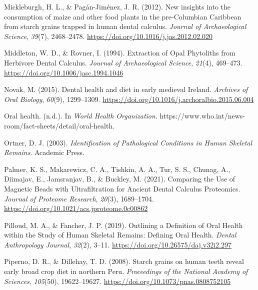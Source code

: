 \documentclass[
  b5paper,
]{book}
\newlength{\cslhangindent}
\newlength{\cslentryspacingunit} %
\newenvironment{CSLReferences}[2] %
 {%
  \setlength{\parindent}{0pt}
  \ifodd #1
  \let\oldpar\par
  \def\par{\hangindent=\cslhangindent\oldpar}
  \fi
  \setlength{\parskip}{#2\cslentryspacingunit}
 }%
 {}
\begin{document}
\begin{CSLReferences}{1}{0}
\leavevmode{}%
Mickleburgh, H. L., \& Pagán-Jiménez, J. R. (2012). New insights into
the consumption of maize and other food plants in the pre-{Columbian
Caribbean} from starch grains trapped in human dental calculus.
\emph{Journal of Archaeological Science}, \emph{39}(7), 2468--2478.
\url{https://doi.org/10.1016/j.jas.2012.02.020}

\leavevmode{}%
Middleton, W. D., \& Rovner, I. (1994). Extraction of {Opal Phytoliths}
from {Herbivore Dental Calculus}. \emph{Journal of Archaeological
Science}, \emph{21}(4), 469--473.
\url{https://doi.org/10.1006/jasc.1994.1046}

\leavevmode{}%
Novak, M. (2015). Dental health and diet in early medieval {Ireland}.
\emph{Archives of Oral Biology}, \emph{60}(9), 1299--1309.
\url{https://doi.org/10.1016/j.archoralbio.2015.06.004}

\leavevmode{}%
Oral health. (n.d.). In \emph{World Health Organization}.
https://www.who.int/news-room/fact-sheets/detail/oral-health.

\leavevmode{}%
Ortner, D. J. (2003). \emph{Identification of {Pathological Conditions}
in {Human Skeletal Remains}}. {Academic Press}.

\leavevmode{}%
Palmer, K. S., Makarewicz, C. A., Tishkin, A. A., Tur, S. S., Chunag,
A., Diimajav, E., Jamsranjav, B., \& Buckley, M. (2021). Comparing the
{Use} of {Magnetic Beads} with {Ultrafiltration} for {Ancient Dental
Calculus Proteomics}. \emph{Journal of Proteome Research}, \emph{20}(3),
1689--1704. \url{https://doi.org/10.1021/acs.jproteome.0c00862}

\leavevmode{}%
Pilloud, M. A., \& Fancher, J. P. (2019). Outlining a {Definition} of
{Oral Health} within the {Study} of {Human Skeletal Remains}: {Defining
Oral Health}. \emph{Dental Anthropology Journal}, \emph{32}(2), 3--11.
\url{https://doi.org/10.26575/daj.v32i2.297}

\leavevmode{}%
Piperno, D. R., \& Dillehay, T. D. (2008). Starch grains on human teeth
reveal early broad crop diet in northern {Peru}. \emph{Proceedings of
the National Academy of Sciences}, \emph{105}(50), 19622--19627.
\url{https://doi.org/10.1073/pnas.0808752105}


\end{CSLReferences}
\end{document}
